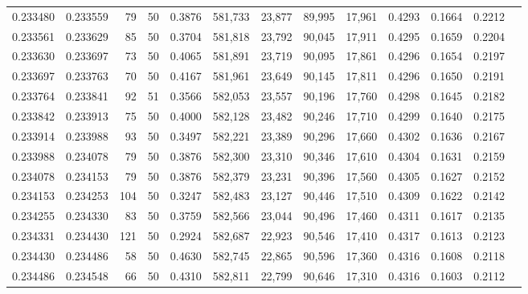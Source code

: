 \begin{tabular}{rrrrrrrrrrrrr}
0.233480 & 0.233559 &    79 &  50 &                                     0.3876 & 581,733 &  23,877 &  89,995 &  17,961 & 0.4293 & 0.1664 & 0.2212 \\
0.233561 & 0.233629 &    85 &  50 &                                     0.3704 & 581,818 &  23,792 &  90,045 &  17,911 & 0.4295 & 0.1659 & 0.2204 \\
0.233630 & 0.233697 &    73 &  50 &                                     0.4065 & 581,891 &  23,719 &  90,095 &  17,861 & 0.4296 & 0.1654 & 0.2197 \\
0.233697 & 0.233763 &    70 &  50 &                                     0.4167 & 581,961 &  23,649 &  90,145 &  17,811 & 0.4296 & 0.1650 & 0.2191 \\
0.233764 & 0.233841 &    92 &  51 &                                     0.3566 & 582,053 &  23,557 &  90,196 &  17,760 & 0.4298 & 0.1645 & 0.2182 \\
0.233842 & 0.233913 &    75 &  50 &                                     0.4000 & 582,128 &  23,482 &  90,246 &  17,710 & 0.4299 & 0.1640 & 0.2175 \\
0.233914 & 0.233988 &    93 &  50 &                                     0.3497 & 582,221 &  23,389 &  90,296 &  17,660 & 0.4302 & 0.1636 & 0.2167 \\
0.233988 & 0.234078 &    79 &  50 &                                     0.3876 & 582,300 &  23,310 &  90,346 &  17,610 & 0.4304 & 0.1631 & 0.2159 \\
0.234078 & 0.234153 &    79 &  50 &                                     0.3876 & 582,379 &  23,231 &  90,396 &  17,560 & 0.4305 & 0.1627 & 0.2152 \\
0.234153 & 0.234253 &   104 &  50 &                                     0.3247 & 582,483 &  23,127 &  90,446 &  17,510 & 0.4309 & 0.1622 & 0.2142 \\
0.234255 & 0.234330 &    83 &  50 &                                     0.3759 & 582,566 &  23,044 &  90,496 &  17,460 & 0.4311 & 0.1617 & 0.2135 \\
0.234331 & 0.234430 &   121 &  50 &                                     0.2924 & 582,687 &  22,923 &  90,546 &  17,410 & 0.4317 & 0.1613 & 0.2123 \\
0.234430 & 0.234486 &    58 &  50 &                                     0.4630 & 582,745 &  22,865 &  90,596 &  17,360 & 0.4316 & 0.1608 & 0.2118 \\
0.234486 & 0.234548 &    66 &  50 &                                     0.4310 & 582,811 &  22,799 &  90,646 &  17,310 & 0.4316 & 0.1603 & 0.2112 \\

\end{tabular}
